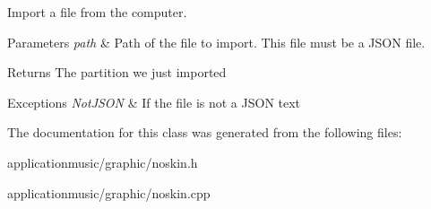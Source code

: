 Import a file from the computer. 


\begin{DoxyParams}{Parameters}
{\em path} & Path of the file to import. This file must be a J\-S\-O\-N file. \\
\hline
\end{DoxyParams}
\begin{DoxyReturn}{Returns}
The partition we just imported 
\end{DoxyReturn}

\begin{DoxyExceptions}{Exceptions}
{\em Not\-J\-S\-O\-N} & If the file is not a J\-S\-O\-N text \\
\hline
\end{DoxyExceptions}


The documentation for this class was generated from the following files\-:\begin{DoxyCompactItemize}
\item 
applicationmusic/graphic/noskin.\-h\item 
applicationmusic/graphic/noskin.\-cpp\end{DoxyCompactItemize}
